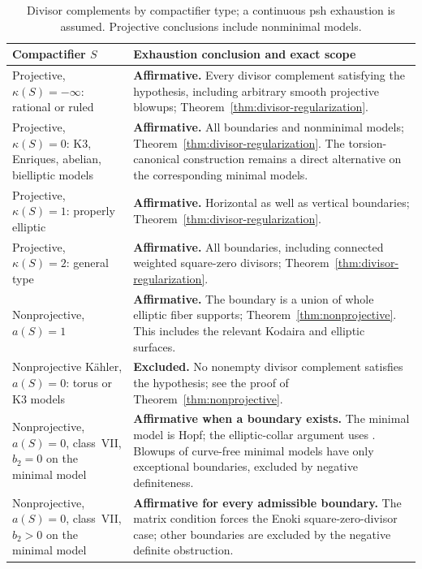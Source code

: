 \documentclass[11pt]{amsart}
\theoremstyle{definition}
\theoremstyle{remark}
\numberwithin{equation}{section}
\begin{document}
\begin{table}[!htbp]
\caption{Divisor complements by compactifier type; a continuous psh exhaustion is assumed. Projective conclusions include nonminimal models.}
\label{tab:surface-status}
\small
\renewcommand{\arraystretch}{1.16}
\begin{tabularx}{\textwidth}{@{}>{\raggedright\arraybackslash}p{}>{\raggedright\arraybackslash}X@{}}
\toprule
Compactifier $S$ & Exhaustion conclusion and exact scope\\
\midrule
Projective, $\kappa(S)=-\infty$: rational or ruled
& \textbf{Affirmative.} Every divisor complement satisfying the hypothesis, including arbitrary smooth projective blowups; Theorem~\ref{thm:divisor-regularization}.\\
\addlinespace
Projective, $\kappa(S)=0$: K3, Enriques, abelian, bielliptic models
& \textbf{Affirmative.} All boundaries and nonminimal models; Theorem~\ref{thm:divisor-regularization}. The torsion-canonical construction remains a direct alternative on the corresponding minimal models.\\
\addlinespace
Projective, $\kappa(S)=1$: properly elliptic
& \textbf{Affirmative.} Horizontal as well as vertical boundaries; Theorem~\ref{thm:divisor-regularization}.\\
\addlinespace
Projective, $\kappa(S)=2$: general type
& \textbf{Affirmative.} All boundaries, including connected weighted square-zero divisors; Theorem~\ref{thm:divisor-regularization}.\\
\midrule
Nonprojective, $a(S)=1$
& \textbf{Affirmative.} The boundary is a union of whole elliptic fiber supports; Theorem~\ref{thm:nonprojective}. This includes the relevant Kodaira and elliptic surfaces.\\
\addlinespace
Nonprojective K\"ahler, $a(S)=0$: torus or K3 models
& \textbf{Excluded.} No nonempty divisor complement satisfies the hypothesis; see the proof of Theorem~\ref{thm:nonprojective}.\\
\addlinespace
Nonprojective, $a(S)=0$, class~VII, $b_2=0$ on the minimal model
& \textbf{Affirmative when a boundary exists.} The minimal model is Hopf; the elliptic-collar argument uses \cite{CFSTZ2026}. Blowups of curve-free minimal models have only exceptional boundaries, excluded by negative definiteness.\\
\addlinespace
Nonprojective, $a(S)=0$, class~VII, $b_2>0$ on the minimal model
& \textbf{Affirmative for every admissible boundary.} The matrix condition forces the Enoki square-zero-divisor case; other boundaries are excluded by the negative definite obstruction.\\
\bottomrule
\end{tabularx}
\end{table}
\FloatBarrier
\clearpage
\end{document}
